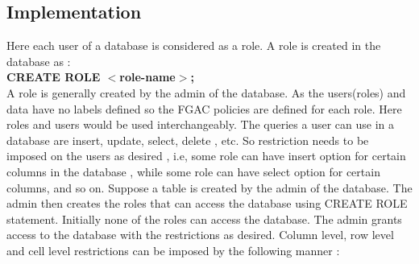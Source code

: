 \documentclass[11pt,a4paper]{report}
\begin{document}
\subsection{Implementation}
Here each user of a database is considered as a role. A role is created in the database as : \\[2em]
   \textbf{ CREATE ROLE $<$role-name$>$;}\\[2em] 
A role is generally created by the admin of the database. 
As the users(roles) and data have no labels defined so the FGAC policies are defined for each role. Here roles and users would be used interchangeably. The queries a user can use in a database are insert, update, select, delete , etc. So restriction needs to be imposed on the users as desired , i.e, some role can have insert option for certain columns in the database , while some role can have select option for certain columns, and so on. 
Suppose a table is created by the admin of the database. The admin then creates the roles that can access the database using CREATE ROLE statement. Initially none of the roles can access the database. The admin grants access to the database with the restrictions as desired. Column level, row level and cell level restrictions can be imposed by the following manner : 
\end{document}
